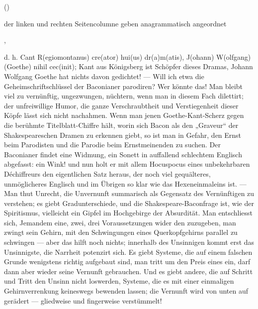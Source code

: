 ()
\par

der linken und rechten Seitencolumne geben anagrammatisch angeordnet
\par

,
\par

d. h. Cant R(egiomontanus) cre(ator) hui(us) dr(a)m(atis), J(ohann) W(olfgang) (Goethe) nihil cec(init); Kant aus Königsberg ist Schöpfer dieses Dramas, Johann Wolfgang Goethe hat nichts davon gedichtet! — Will ich etwa die Geheimschriftschlüssel der Baconianer parodiren? Wer könnte das! Man bleibt viel zu vernünftig, ungezwungen, nüchtern, wenn man in diesem Fach dilettirt; der unfreiwillige Humor, die ganze Verschraubtheit und Verstiegenheit dieser Köpfe lässt sich nicht nachahmen. Wenn man jenen Goethe-Kant-Scherz gegen die berühmte Titelblatt-Chiffre hält, worin sich Bacon als den „Graveur“ der Shakespeareschen Dramen zu erkennen giebt, so ist man in Gefahr, den Ernst beim Parodisten und die Parodie beim Ernstmeinenden zu suchen. Der Baconianer findet eine Widmung, ein Sonett in auffallend schlechtem Englisch abgefasst: ein Wink! und nun holt er mit allem Hocuspocus eines unbekehrbaren Déchiffreurs den eigentlichen Satz heraus, der noch viel gequälteres, unmöglicheres Englisch und im Übrigen so klar wie das Hexeneinmaleins ist. — Man thut Unrecht, die Unvernunft summarisch als Gegensatz des Vernünftigen zu verstehen; es giebt Gradunterschiede, und die Shakespeare-Baconfrage ist, wie der Spiritismus, vielleicht ein Gipfel im Hochgebirge der Absurdität. Man entschliesst sich, Jemandem eine, zwei, drei Voraussetzungen wider den  zuzugeben, man zwingt sein Gehirn, mit den Schwingungen eines Querkopfgehirns parallel zu schwingen — aber das hilft noch nichts; innerhalb des Unsinnigen kommt erst das Unsinnigste, die Narrheit potenzirt sich. Es giebt Systeme, die auf einem falschen Grunde wenigstens richtig aufgebaut sind, man tritt um den Preis eines  ein, darf dann aber wieder seine Vernunft gebrauchen. Und es giebt andere, die auf Schritt und Tritt den Unsinn nicht loswerden, Systeme, die es mit einer einmaligen Gehirnverrenkung keineswegs bewenden lassen; die Vernunft wird von unten auf gerädert — gliedweise und fingerweise verstümmelt!
\par


